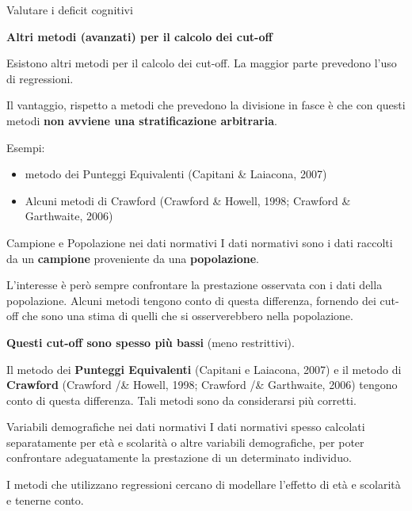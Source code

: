 \documentclass[
  ignorenonframetext,
]{beamer}
\begin{document}
\begin{frame}{Valutare i deficit cognitivi}
\label{valutare-i-deficit-cognitivi-22}
\begin{center}
  \textbf{Altri metodi (avanzati) per il calcolo dei cut-off}
\end{center}
\vspace{1em}

Esistono altri metodi per il calcolo dei cut-off. La maggior parte
prevedono l'uso di regressioni.

Il vantaggio, rispetto a metodi che prevedono la divisione in fasce è
che con questi metodi \textbf{non avviene una stratificazione
arbitraria}.

Esempi:

\begin{itemize}
\item
  metodo dei Punteggi Equivalenti (Capitani \& Laiacona, 2007)
\item
  Alcuni metodi di Crawford (Crawford \& Howell, 1998; Crawford \&
  Garthwaite, 2006)
\end{itemize}
\end{frame}

\begin{frame}{Campione e Popolazione nei dati normativi}
\label{campione-e-popolazione-nei-dati-normativi}
I dati normativi sono i dati raccolti da un \textbf{campione}
proveniente da una \textbf{popolazione}.

L'interesse è però sempre confrontare la prestazione osservata con i
dati della popolazione. Alcuni metodi tengono conto di questa
differenza, fornendo dei cut-off che sono una stima di quelli che si
osserverebbero nella popolazione.

\textbf{Questi cut-off sono spesso più bassi} (meno restrittivi).

Il metodo dei \textbf{Punteggi Equivalenti} (Capitani e Laiacona, 2007)
e il metodo di \textbf{Crawford} (Crawford /\& Howell, 1998; Crawford
/\& Garthwaite, 2006) tengono conto di questa differenza. Tali metodi
sono da considerarsi più corretti.
\end{frame}

\begin{frame}{Variabili demografiche nei dati normativi}
\label{variabili-demografiche-nei-dati-normativi}
I dati normativi spesso calcolati separatamente per età e scolarità o
altre variabili demografiche, per poter confrontare adeguatamente la
prestazione di un determinato individuo.

I metodi che utilizzano regressioni cercano di modellare l'effetto di
età e scolarità e tenerne conto.
\end{frame}
\end{document}

